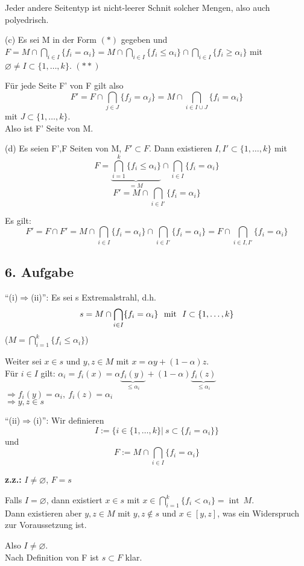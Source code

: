 \documentclass[a4paper,11pt,twoside,titlepage]{article}
\newcommand{\inter}{{\operatorname{int}\:}}
\begin{document}
Jeder andere Seitentyp ist nicht-leerer Schnit solcher Mengen, also auch polyedrisch.

(c) Es sei M in der Form $(\ast)$ gegeben und $F=M\cap\bigcap_{i\in I}\{f_{i}=\alpha_{i}\}=M\cap\bigcap_{i\in I}\{f_{i}\leq\alpha_{i}\}\cap\bigcap_{i\in I}\{f_{i}\geq\alpha_{i}\}$ mit $\varnothing\neq I\subset\{1,\ldots, k\}$. $(\ast\ast)$

Für jede Seite F' von F gilt also 
\[F'=F\cap\bigcap_{j\in J}\{f_j=\alpha_j\}=M\cap\bigcap_{i\in I\cup J}\{f_i=\alpha_i\}\]
mit $J\subset\{1,\ldots,k\}$.\\
Also ist F' Seite von M.

(d) Es seien F',F Seiten von M, $F'\subset F$. Dann existieren $I,I'\subset\{1,\ldots,k\}$ mit
\[F=\underbrace{\bigcap_{i=1}^k\{f_i\leq\alpha_i\}}_{=M}\cap\bigcap_{i\in I}\{f_i=\alpha_i\}\]
\[F'=M\cap\bigcap_{i\in I'}\{f_i=\alpha_i\}\]

Es gilt:
\[F'=F\cap F'=M\cap\bigcap_{i\in I}\{f_i=\alpha_i\}\cap\bigcap_{i\in I'}\{f_i=\alpha_i\}=F\cap\bigcap_{i\in I,I'}\{f_i=\alpha_i\}\]

\subsection*{6. Aufgabe}
"`(i)$\Rightarrow$(ii)"': Es sei s Extremalstrahl, d.h.
\[s=M\cap\bigcap_{i\in I}\{f_i=\alpha_i\}\ \textnormal{ mit }\ I\subset\{1,\ldots,k\}\]
($M=\bigcap\limits_{i=1}^k\{f_i\leq\alpha_i\}$)

Weiter sei $x\in s$ und $y,z\in M$ mit $x=\alpha y+(1-\alpha)z$.\\
Für $i\in I$ gilt: $\alpha_i=f_i(x)=\alpha \underbrace{f_i(y)}_{\leq\alpha_i}+(1-\alpha)\underbrace{f_i(z)}_{\leq\alpha_i}$ $\Rightarrow f_i(y)=\alpha_i,\:f_i(z)=\alpha_i$\\
$\Rightarrow y,z\in s$

"`(ii)$\Rightarrow$(i)"': Wir definieren \[I:=\{i\in\{1,\ldots,k\}|\:s\subset\{f_i=\alpha_i\}\}\]
und \[F:=M\cap\bigcap_{i\in I}\{f_i=\alpha_i\}\]

\textbf{z.z.:} $I\neq\varnothing$, $F=s$

Falls $I=\varnothing$, dann existiert $x\in s$ mit $x\in\bigcap_{i=1}^k\{f_i<\alpha_i\}=\inter M$.\\
Dann existieren aber $y,z\in M$ mit $y,z\not\in s$ und $x\in[y,z]$, was ein Widerspruch zur Voraussetzung ist.

Also $I\neq\varnothing$.\\
Nach Definition von F ist $s\subset F$ klar.
\end{document}
